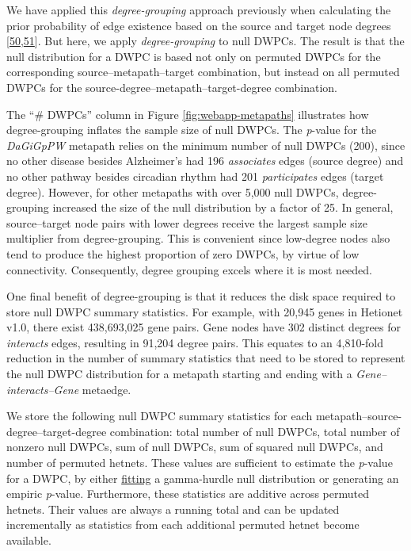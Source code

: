 We have applied this \emph{degree-grouping} approach previously when calculating the prior probability of edge existence based on the source and target node degrees {[}\protect\hyperlink{ref-83EvMSI6}{50},\protect\hyperlink{ref-19OyKPQ4M}{51}{]}.
But here, we apply \emph{degree-grouping} to null DWPCs.
The result is that the null distribution for a DWPC is based not only on permuted DWPCs for the corresponding source--metapath--target combination,
but instead on all permuted DWPCs for the source-degree--metapath--target-degree combination.

The ``\# DWPCs'' column in Figure \ref{fig:webapp-metapaths} illustrates how degree-grouping inflates the sample size of null DWPCs.
The \emph{p}-value for the \emph{DaGiGpPW} metapath relies on the minimum number of null DWPCs (200),
since no other disease besides Alzheimer's had 196 \emph{associates} edges (source degree) and no other pathway besides circadian rhythm had 201 \emph{participates} edges (target degree).
However, for other metapaths with over 5,000 null DWPCs, degree-grouping increased the size of the null distribution by a factor of 25.
In general, source--target node pairs with lower degrees receive the largest sample size multiplier from degree-grouping.
This is convenient since low-degree nodes also tend to produce the highest proportion of zero DWPCs, by virtue of low connectivity.
Consequently, degree grouping excels where it is most needed.

One final benefit of degree-grouping is that it reduces the disk space required to store null DWPC summary statistics.
For example, with 20,945 genes in Hetionet v1.0, there exist 438,693,025 gene pairs.
Gene nodes have 302 distinct degrees for \emph{interacts} edges, resulting in 91,204 degree pairs.
This equates to an 4,810-fold reduction in the number of summary statistics that need to be stored to represent the null DWPC distribution for a metapath starting and ending with a \emph{Gene--interacts--Gene} metaedge.

We store the following null DWPC summary statistics for each metapath--source-degree--target-degree combination:
total number of null DWPCs,
total number of nonzero null DWPCs,
sum of null DWPCs,
sum of squared null DWPCs,
and number of permuted hetnets.
These values are sufficient to estimate the \emph{p}-value for a DWPC, by either \href{https://github.com/hetio/hetmatpy/blob/bc36aa9859c43a1a5fb22808cd6eb952ef9d497c/hetmatpy/pipeline.py\#L42-L63}{fitting} a gamma-hurdle null distribution or generating an empiric \emph{p}-value.
Furthermore, these statistics are additive across permuted hetnets.
Their values are always a running total and can be updated incrementally as statistics from each additional permuted hetnet become available.

